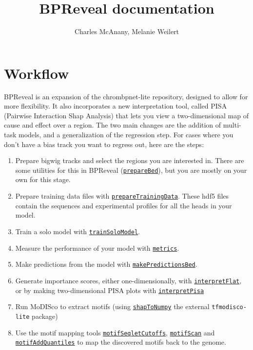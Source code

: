\documentclass{article}
\title{BPReveal documentation}
\author{Charles McAnany, Melanie Weilert}
\begin{document}
\newcommand{\deprecation}[1]{\colorbox{orange}{#1}}
\newcommand{\progref}[1]{\hyperref[prog:#1]{\texttt{#1}}}
\maketitle

\tableofcontents

\newpage

\section{Workflow}

BPReveal is an expansion of the chrombpnet-lite repository, designed to allow
for more flexibility.
It also incorporates a new interpretation tool, called PISA (Pairwise
Interaction Shap Analysis) that lets you view a two-dimensional map of cause
and effect over a region.
The two main changes are the addition of multi-task models, and a
generalization of the regression step.
For cases where you don't have a bias track you want to regress out, here are
the steps:

\begin{enumerate}
    \item Prepare bigwig tracks and select the regions you are interested in.
        There are some utilities for this in BPReveal (\progref{prepareBed}),
        but you are mostly on your own for this stage.
    \item Prepare training data files with \progref{prepareTrainingData}.
        These hdf5 files contain the sequences and experimental profiles for
        all the heads in your model.
    \item Train a solo model with \progref{trainSoloModel}.
    \item Measure the performance of your model with \progref{metrics}.
    \item Make predictions from the model with \progref{makePredictionsBed}.
    \item Generate importance scores, either one-dimensionally, with
        \progref{interpretFlat}, or by making two-dimensional PISA plots with
        \progref{interpretPisa}
    \item Run MoDISco to extract motifs (using \progref{shapToNumpy} the
        external \texttt{tfmodisco-lite} package)
    \item Use the motif mapping tools \progref{motifSeqletCutoffs},
        \progref{motifScan} and \progref{motifAddQuantiles} to map the
        discovered motifs back to the genome.
\end{enumerate}
\end{document}
